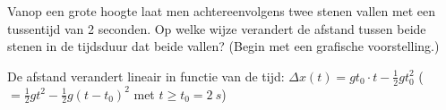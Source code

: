
\begin{exercise}


Vanop een grote hoogte laat men achtereenvolgens twee stenen vallen met een tussentijd van 2 seconden. Op welke wijze verandert de afstand tussen beide stenen in de tijdsduur dat beide vallen? (Begin met een grafische voorstelling.) 

\begin{oplossing}
	De afstand verandert lineair in functie van de tijd: $\Delta x(t)=gt_0\cdot t-\frac{1}{2}gt_0^2$ ($=\frac{1}{2}gt^2-\frac{1}{2}g(t-t_0)^2$ met $t\geq t_0=\SI{2}{s}$)
\end{oplossing}

\end{exercise}
